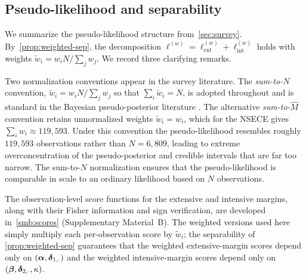 
\subsection{Pseudo-likelihood and separability}
\label{smc:pseudo-lik}

We summarize the pseudo-likelihood structure
from~\cref{sec:survey}.
By~\cref{prop:weighted-sep}, the decomposition
$\ell^{(w)}
 = \ell_{\mathrm{ext}}^{(w)}
 \allowbreak+ \ell_{\mathrm{int}}^{(w)}$
holds with weights
$\tilde{w}_i = w_i N / \sum_j w_j$.
We record three clarifying remarks.

\begin{remark}\label{smc:rem-normalization}
  Two normalization conventions appear in the survey literature.
  The \emph{sum-to-$N$} convention, $\tilde{w}_i = w_i N / \sum_j w_j$
  so that $\sum_i \tilde{w}_i = N$, is adopted throughout and is standard
  in the Bayesian pseudo-posterior literature
  \citep{SavitskyToth2016,WilliamsSavitsky2021}.
  The alternative \emph{sum-to-$\hat{M}$} convention retains unnormalized
  weights $\tilde{w}_i = w_i$, which for the NSECE gives
  $\sum_i w_i \approx 119{,}593$.  Under this convention the
  pseudo-likelihood resembles roughly $119{,}593$ observations rather
  than $N = 6{,}809$, leading to extreme overconcentration of the
  pseudo-posterior and credible intervals that are far too narrow.
  The sum-to-$N$ normalization ensures that the pseudo-likelihood is
  comparable in scale to an ordinary likelihood based on $N$ observations.
\end{remark}

\begin{remark}\label{smc:rem-scores}
  The observation-level score functions for the extensive and intensive
  margins, along with their Fisher information and sign verification,
  are developed in~\cref{smb:scores} (Supplementary Material~B).
  The weighted versions used here simply multiply each per-observation
  score by $\tilde{w}_i$; the separability of
  \cref{prop:weighted-sep} guarantees that the weighted
  extensive-margin scores depend only on $(\boldsymbol{\alpha}, \boldsymbol{\delta}_{1,\cdot})$
  and the weighted intensive-margin scores depend only on
  $(\boldsymbol{\beta}, \boldsymbol{\delta}_{2,\cdot}, \kappa)$.
\end{remark}


